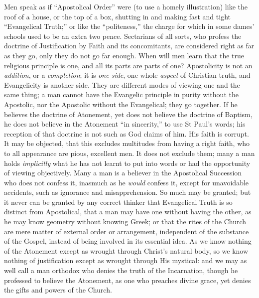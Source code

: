 Men speak as if ``Apostolical Order'' were (to use
a homely illustration) like the roof of a house, or the top of a box,
shutting in and making fast and tight ``Evangelical Truth;'' or like the
``politeness,'' the charge for which in some dames' schools used to be
an extra two pence. Sectarians of all sorts, who profess the doctrine
of Justification by Faith and its concomitants, are considered right
as far as they go, only they do not go far enough. When will men learn
that the true religious principle is one, and all its parts are parts
of one? Apostolicity is not an \emph{addition}, or a \emph{completion};
it is \emph{one side}, one whole \emph{aspect} of Christian truth, and
Evangelicity is another side. They are different modes of viewing one
and the same thing; a man cannot have the Evangelic principle in
purity without the Apostolic, nor the Apostolic without the
Evangelical; they go together. If he believes the doctrine of
Atonement, yet does not believe the doctrine of Baptism, he does not
believe in the Atonement ``in sincerity,'' to use St Paul's words; his
reception of that doctrine is not such as God claims of him. His faith
is corrupt. It may be objected, that this excludes multitudes from
having a right faith, who to all appearance are pious, excellent men.
It does not exclude them; many a man holds \emph{implicitly} what he
has not learnt to put into words or had the opportunity of viewing
objectively. Many a man is a believer in the Apostolical Succession
who does not confess it, inasmuch as he \emph{would} confess it,
except for unavoidable accidents, such as ignorance and
misapprehension. So much may be granted; but it never can be granted
by any correct thinker that Evangelical Truth is so distinct from
Apostolical, that a man may have one without having the other,
as he may know geometry without knowing Greek; or that the rites of
the Church are mere matter of external order or arrangement,
independent of the substance of the Gospel, instead of being involved
in its essential idea. As we know nothing of the Atonement except as
wrought through Christ's natural body, so we know nothing of
justification except as wrought through His mystical: and we may as
well call a man orthodox who denies the truth of the Incarnation,
though he professed to believe the Atonement, as one who preaches
divine grace, yet denies the gifts and powers of the Church.

